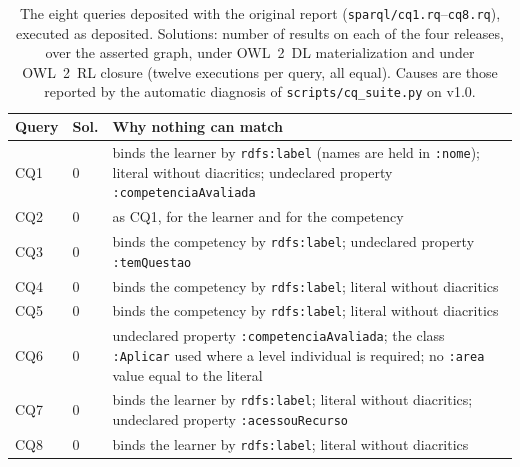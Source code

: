 \begin{table}[!t]
\caption{The eight queries deposited with the original report (\texttt{sparql/cq1.rq}--\texttt{cq8.rq}), executed as deposited. Solutions: number of results on each of the four releases, over the asserted graph, under OWL~2~DL materialization and under OWL~2~RL closure (twelve executions per query, all equal). Causes are those reported by the automatic diagnosis of \texttt{scripts/cq\_suite.py} on v1.0.}
\label{tab:cqdep}
\centering
\footnotesize
\begin{tabular}{p{0.75cm}p{0.5cm}>{\raggedright\arraybackslash}p{6.0cm}}
\hline
\textbf{Query} & \textbf{Sol.} & \textbf{Why nothing can match} \\
\hline
CQ1 & 0 & binds the learner by \texttt{rdfs:label} (names are held in \texttt{:nome}); literal without diacritics; undeclared property \texttt{:competenciaAvaliada} \\
CQ2 & 0 & as CQ1, for the learner and for the competency \\
CQ3 & 0 & binds the competency by \texttt{rdfs:label}; undeclared property \texttt{:temQuestao} \\
CQ4 & 0 & binds the competency by \texttt{rdfs:label}; literal without diacritics \\
CQ5 & 0 & binds the competency by \texttt{rdfs:label}; literal without diacritics \\
CQ6 & 0 & undeclared property \texttt{:competenciaAvaliada}; the class \texttt{:Aplicar} used where a level individual is required; no \texttt{:area} value equal to the literal \\
CQ7 & 0 & binds the learner by \texttt{rdfs:label}; literal without diacritics; undeclared property \texttt{:acessouRecurso} \\
CQ8 & 0 & binds the learner by \texttt{rdfs:label}; literal without diacritics \\
\hline
\end{tabular}
\end{table}
